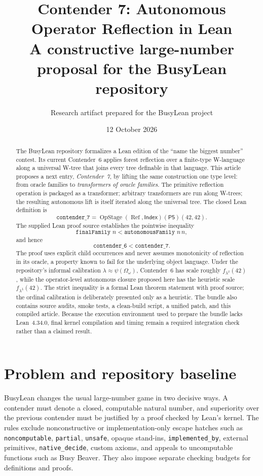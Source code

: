 \documentclass[11pt]{article}
\title{\textbf{Contender 7: Autonomous Operator Reflection in Lean}\\[0.45em]
\large A constructive large-number proposal for the BusyLean repository}
\author{Research artifact prepared for the BusyLean project}
\date{12 October 2026}
\theoremstyle{definition}
\theoremstyle{remark}
\newcommand{\OpStage}{\operatorname{OpStage}}
\newcommand{\Refl}{\operatorname{Ref}}
\newcommand{\Index}{\mathsf{Index}}
\newcommand{\Pfive}{\mathsf{P5}}
\newcommand{\lean}[1]{\texttt{#1}}
\begin{document}
\maketitle

\begin{abstract}
The BusyLean repository formalizes a Lean edition of the ``name the biggest
number'' contest.  Its current Contender~6 applies forest reflection over a
finite-type W-language along a universal W-tree that joins every tree definable
in that language.  This article proposes a next entry, \emph{Contender~7}, by
lifting the same construction one type level: from oracle families to
\emph{transformers of oracle families}.  The primitive reflection operation is
packaged as a transformer; arbitrary transformers are run along W-trees; the
resulting autonomous lift is itself iterated along the universal tree.  The
closed Lean definition is
\[
  \lean{contender\_7}
  = \OpStage(\Refl,\Index)(\Pfive)(42,42).
\]
The supplied Lean proof source establishes the pointwise inequality
\[
  \texttt{finalFamily }n
  < \texttt{autonomousFamily }n\,n,
\]
and hence
\[
  \texttt{contender\_6}<\texttt{contender\_7}.
\]
The proof uses explicit child occurrences and never assumes monotonicity of
reflection in its oracle, a property known to fail for the underlying object
language.  Under the repository's informal calibration
\(\lambda\approx\psi(\Omega_\omega)\), Contender~6 has scale roughly
\(f_{\lambda^2}(42)\), while the operator-level autonomous closure proposed
here has the heuristic scale \(f_{\lambda^\lambda}(42)\).  The strict
inequality is a formal Lean theorem statement with proof source; the ordinal
calibration is deliberately presented only as a heuristic.  The bundle also
contains source audits, smoke tests, a clean-build script, a unified patch, and
this compiled article.  Because the execution environment used to prepare the
bundle lacks Lean~4.34.0, final kernel compilation and timing remain a required
integration check rather than a claimed result.
\end{abstract}

\tableofcontents

\section{Problem and repository baseline}

BusyLean changes the usual large-number game in two decisive ways.  A contender
must denote a closed, computable natural number, and superiority over the
previous contender must be justified by a proof checked by Lean's kernel.  The
rules exclude nonconstructive or implementation-only escape hatches such as
\lean{noncomputable}, \lean{partial}, \lean{unsafe}, opaque stand-ins,
\lean{implemented\_by}, external primitives, \lean{native\_decide}, custom
axioms, and appeals to uncomputable functions such as Busy Beaver.  They also
impose separate checking budgets for definitions and proofs.
\end{document}
